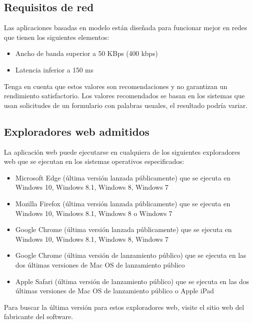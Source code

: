 \documentclass[12pt, a4paper, titlepage]{article}
\begin{document}
		\subsection{Requisitos de red}
		Las aplicaciones basadas en modelo están diseñada para funcionar
		mejor en redes que tienen los siguientes elementos:
		
		\begin{itemize}
			\item Ancho de banda superior a 50 KBps (400 kbps)
			\item Latencia inferior a 150 ms
		\end{itemize}
		
		Tenga en cuenta que estos valores son recomendaciones y no garantizan
		un rendimiento satisfactorio. Los valores recomendados se basan en los
		sistemas que usan solicitudes de un formulario con palabras usuales,
		el resultado podría variar.
		
		\subsection{Exploradores web admitidos}
			La aplicación web puede ejecutarse en cualquiera de los siguientes
			exploradores web que se ejecutan en los sistemas operativos especificados:
			\begin{itemize}
			\item Microsoft Edge (última versión lanzada públicamente) que se ejecuta en Windows 10, Windows 8.1, Windows 8, Windows 7
			\item Mozilla Firefox (última versión lanzada públicamente) que se ejecuta en Windows 10, Windows 8.1, Windows 8 o Windows 7
			\item Google Chrome (última versión lanzada públicamente) que se ejecuta en Windows 10, Windows 8.1, Windows 8, Windows 7
			\item Google Chrome (última versión de lanzamiento público) que se ejecuta en las dos últimas versiones de Mac OS de lanzamiento público
			\item Apple Safari (última versión de lanzamiento público) que se ejecuta en las dos últimas versiones de Mac OS de lanzamiento público o Apple iPad
			\end{itemize}
			
			Para buscar la última versión para estos exploradores web,
			visite el sitio web del fabricante del software.
\end{document}
